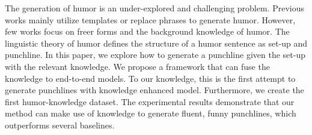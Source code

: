The generation of humor is an under-explored and challenging problem. Previous works mainly utilize templates or replace phrases to generate humor. However, few works focus on freer forms and the background knowledge of humor. The linguistic theory of humor defines the structure of a humor sentence as set-up and punchline. In this paper, we explore how to generate a punchline given the set-up with the relevant knowledge. We propose a framework that can fuse the knowledge to end-to-end models. To our knowledge, this is the first attempt to generate punchlines with knowledge enhanced model. Furthermore, we create the first humor-knowledge dataset. The experimental results demonstrate that our method can make use of knowledge to generate fluent, funny punchlines, which outperforms several baselines.

